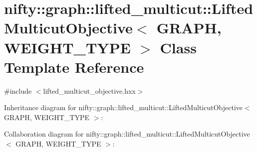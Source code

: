 \hypertarget{classnifty_1_1graph_1_1lifted__multicut_1_1LiftedMulticutObjective}{}\section{nifty\+:\+:graph\+:\+:lifted\+\_\+multicut\+:\+:Lifted\+Multicut\+Objective$<$ G\+R\+A\+P\+H, W\+E\+I\+G\+H\+T\+\_\+\+T\+Y\+P\+E $>$ Class Template Reference}
\label{classnifty_1_1graph_1_1lifted__multicut_1_1LiftedMulticutObjective}


{\ttfamily \#include $<$lifted\+\_\+multicut\+\_\+objective.\+hxx$>$}



Inheritance diagram for nifty\+:\+:graph\+:\+:lifted\+\_\+multicut\+:\+:Lifted\+Multicut\+Objective$<$ G\+R\+A\+P\+H, W\+E\+I\+G\+H\+T\+\_\+\+T\+Y\+P\+E $>$\+:


Collaboration diagram for nifty\+:\+:graph\+:\+:lifted\+\_\+multicut\+:\+:Lifted\+Multicut\+Objective$<$ G\+R\+A\+P\+H, W\+E\+I\+G\+H\+T\+\_\+\+T\+Y\+P\+E $>$\+:
